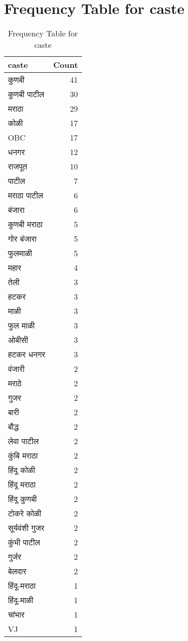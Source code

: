 \documentclass{article}
\begin{document}
\section{Frequency Table for caste}
\begin{table}
\caption{Frequency Table for caste}
\label{tab:caste_freq}
\begin{tabular}{lr}
\toprule
caste & Count \\
\midrule
कुणबी & 41 \\
कुणबी पाटील & 30 \\
मराठा & 29 \\
कोळी & 17 \\
OBC & 17 \\
धनगर & 12 \\
राजपूत & 10 \\
पाटील & 7 \\
मराठा पाटील & 6 \\
बंजारा & 6 \\
कुणबी मराठा & 5 \\
गोर बंजारा & 5 \\
फुलमाळी & 5 \\
महार & 4 \\
तेली & 3 \\
हटकर & 3 \\
माळी & 3 \\
फुल माळी & 3 \\
ओबीसी & 3 \\
हटकर धनगर & 3 \\
वंजारी & 2 \\
मराठे & 2 \\
गुजर & 2 \\
बारी & 2 \\
बौद्ध & 2 \\
लेवा पाटील & 2 \\
कुंबि मराठा & 2 \\
हिंदू कोळी & 2 \\
हिंदू मराठा & 2 \\
हिंदू कुणबी & 2 \\
टोकरे कोळी & 2 \\
सूर्यवंशी गुजर & 2 \\
कुंभी पाटील & 2 \\
गुर्जर & 2 \\
बेलदार & 2 \\
हिंदू-मराठा & 1 \\
हिंदू-माळी & 1 \\
चांभार & 1 \\
VJ & 1 \\

\end{tabular}
\end{table}
\end{document}
